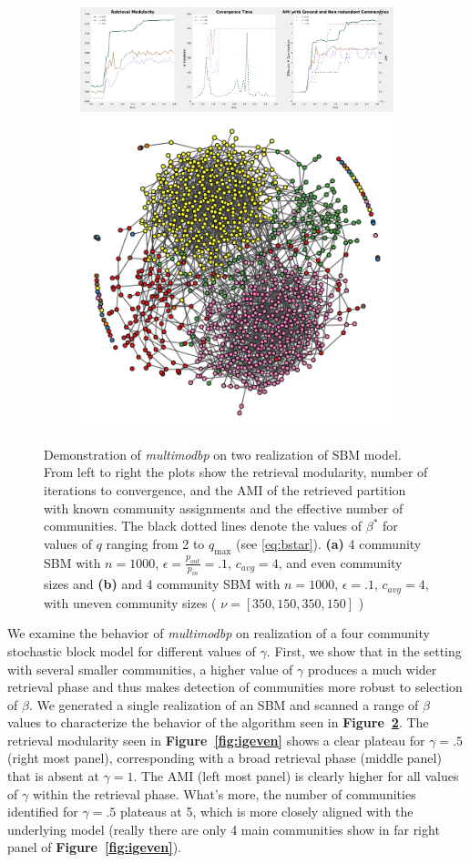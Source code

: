 \documentclass[11pt]{article}
\begin{document}
\begin{figure}[!htb]
\begin{subfigure}{\textwidth}
	\begin{mdframed}
		\includegraphics[width = .74\textwidth]{fourcom_uneven_varyinggamma4c.pdf}
		\includegraphics[width = .24\textwidth]{igraph_uneven_commlayout4c.pdf}
		\hspace{-.2in}
		\begin{minipage}[c]{0.001\textwidth}
		\caption{\label{fig:iguneven}}
		\end{minipage}\hfill%
		\end{mdframed}
\end{subfigure}
\vspace{-.1in}
\caption { Demonstration of \textit{multimodbp} on two realization of SBM model.  From left to right the plots show the retrieval modularity, number of iterations to convergence, and the AMI of the retrieved partition with known community assignments and the effective number of communities.  The black dotted lines denote the values of $\beta^*$ for values of $q$ ranging from 2 to $q_{\text{max}}$ (see \ref{eq:bstar}).  \textbf{(a)} 4 community SBM with $n=1000$,  $\epsilon=\frac{p_{out}}{p_{in}}=.1$, $c_{avg}=4$, and even community sizes and  \textbf{(b)} and 4 community SBM with $n=1000$,  $\epsilon=.1$, $c_{avg}=4$, with  uneven community sizes ( $\nu = [ 350,150,350,150]$ ) \label{fig:singlelayer} } 
\vspace{-.2in}
\end{figure}
We examine the behavior of \textit{multimodbp} on realization of a four community stochastic block model for different values of $\gamma$.  First, we show that in the setting with several smaller communities, a higher value of $\gamma$ produces a much wider retrieval phase and thus makes detection of communities more robust to selection of $\beta$.  We generated a single realization of an SBM and scanned a range of $\beta$ values to characterize the behavior of the algorithm seen in \textbf{Figure~\ref{fig:singlelayer}}.  The retrieval modularity seen in \textbf{Figure~\ref{fig:igeven}} shows a clear plateau for $\gamma=.5$ (right most panel), corresponding with a broad retrieval phase (middle panel) that is absent at $\gamma=1$.  The AMI (left most panel) is clearly higher for all values of $\gamma$ within the retrieval phase.  What's more, the number of communities identified for $\gamma=.5$ plateaus at 5, which is more closely aligned with the underlying model (really there are only 4 main communities show in far right panel of \textbf{Figure~\ref{fig:igeven}}).  
\end{document}
